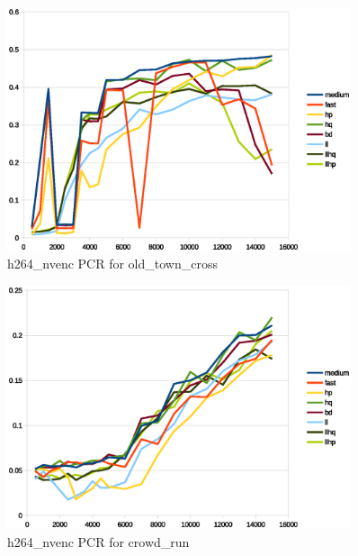 \documentclass[12pt,twoside]{article}
\begin{document}
\begin{figure}[!h]
	\vspace{-10pt}
	\centering
	\includegraphics[width=0.9\textwidth]{img/h264_nvencoldtTownCrossPCR.eps}
	\caption{h264\_nvenc PCR for old\_town\_cross}
	\label{fig:h264_nvencoldtTownCrossPCR}
\end{figure}
\begin{figure}[!h]
	\vspace{-10pt}
	\centering
	\includegraphics[width=0.9\textwidth]{img/h264_nvencCrowdRunPCR.eps}
	\caption{h264\_nvenc PCR for crowd\_run}
	\label{fig:h264_nvencCrowdRunPCR}
\end{figure}
\end{document}
